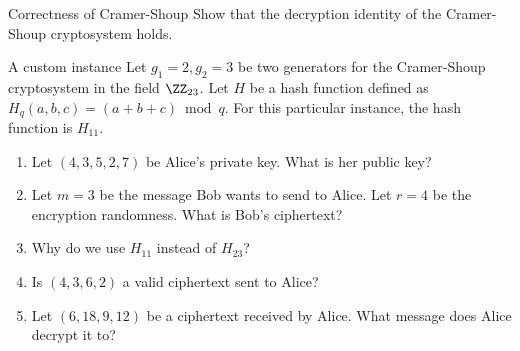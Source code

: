 \documentclass{practice}
\begin{document}
\newpage

\begin{task}{Correctness of Cramer-Shoup}
  Show that the decryption identity of the Cramer-Shoup cryptosystem holds.
\end{task}

\begin{task}{A custom instance}
  Let $g_1=2, g_2=3$ be two generators for the Cramer-Shoup cryptosystem in the field $\ZZ_{23}$.
  Let $H$ be a hash function defined\footnotemark{} as $H_{q}(a, b, c) = (a + b + c) \bmod{q}$.
  For this particular instance, the hash function is $H_{11}$.
  \begin{enumerate}
    \item Let $(4, 3, 5, 2, 7)$ be Alice's private key.
    What is her public key?
    \item Let $m = 3$ be the message Bob wants to send to Alice.
    Let $r = 4$ be the encryption randomness.
    What is Bob's ciphertext?
    \item Why do we use $H_{11}$ instead of $H_{23}$?
    \item Is $(4, 3, 6, 2)$ a valid ciphertext sent to Alice?
    \item Let $(6, 18, 9, 12)$ be a ciphertext received by Alice.
    What message does Alice decrypt it to?
  \end{enumerate}
\end{task}
\end{document}
